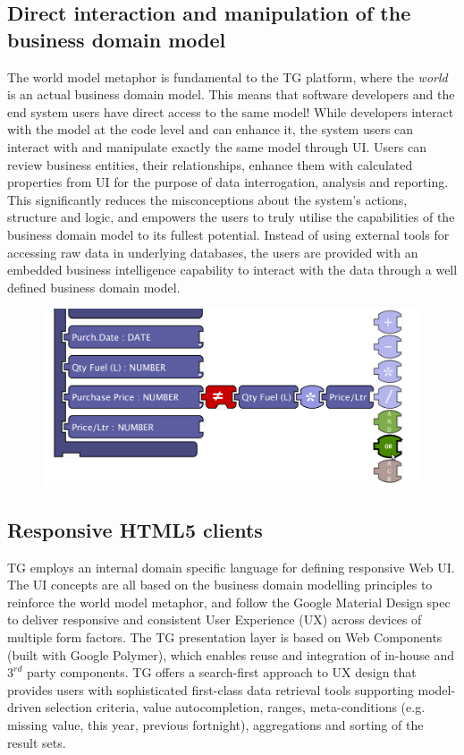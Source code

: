 \documentclass[a4paper,10pt,oneside,openright,final]{memoir} %
\begin{document}
\subsection*{Direct interaction and manipulation of the business domain model}
	The world model metaphor is fundamental to the TG platform, where the \emph{world} is an actual business domain model.
	This means that software developers and the end system users have direct access to the same model!
	While developers interact with the model at the code level and can enhance it, the system users can interact with and manipulate exactly the same model through UI.
	Users can review business entities, their relationships, enhance them with calculated properties from UI for the purpose of data interrogation, analysis and reporting.
	This significantly reduces the misconceptions about the system's actions, structure and logic, and empowers the users to truly utilise the capabilities of the business domain model to its fullest potential.
	Instead of using external tools for accessing raw data in underlying databases, the users are provided with an embedded business intelligence capability to interact with the data through a well defined business domain model.
	\begin{figure}[!h]
  		\centering
  		\includegraphics[scale=0.20]{images/01-rulesarea-suggestionmenu.png}  
		\vspace{-30pt} 
  	\end{figure}

	\BgThispage
\subsection*{Responsive HTML5 clients}
	TG employs an internal domain specific language for defining responsive Web UI.
	The UI concepts are all based on the business domain modelling principles to reinforce the world model metaphor, and follow the Google Material Design spec to deliver responsive and consistent User Experience (UX) across devices of multiple form factors.
	The TG presentation layer is based on Web Components (built with Google Polymer), which enables reuse and integration of in-house and $3^{rd}$ party components.
	TG offers a search-first approach to UX design that provides users with sophisticated first-class data retrieval tools supporting model-driven selection criteria, value autocompletion, ranges, meta-conditions (e.g. missing value, this year, previous fortnight), aggregations and sorting of the result sets. 
\end{document}
